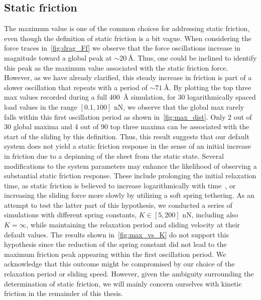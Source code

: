 \subsection{Static friction} 
The maximum value is one of the common choices for addressing static friction,
even though the definition of static friction is a bit vague. When considering
the force traces in~\cref{fig:drag_Ff} we observe that the force oscillations
increase in magnitude toward a global peak at $\sim \SI{20}{\text{Å}}$. Thus,
one could be inclined to identify this peak as the maximum value associated with
the static friction force. However, as we have already clarified, this steady
increase in friction is part of a slower oscillation that repeats with a period
of $\sim \SI{71}{\text{Å}}$. By plotting the top three max values recorded
during a full \SI{400}{Å} simulation, for 30 logarithmically spaced load values
in the range $[0.1, 100]$ nN, we observe that the global max rarely falls within
this first oscillation period as shown in~\cref{fig:max_dist}. Only 2 out of 30
global maxima and 4 out of 90 top three maxima can be associated with the start
of the sliding by this definition. Thus, this result suggests that our default
system does not yield a static friction response in the sense of an initial
increase in friction due to a depinning of the sheet from the static state.
Several modifications to the system parameters may enhance the likelihood of
observing a substantial static friction response. These include prolonging the
initial relaxation time, as static friction is believed to increase
logarithmically with time~\cite{dieterich_1972}, or increasing the sliding force
more slowly by utilizing a soft spring tethering. As an attempt to test the
latter part of this hypothesis, we conducted a series of simulations with
different spring constants, $K\in [5, 200]$ nN, including also $K = \infty$,
while maintaining the relaxation period and sliding velocity at their default
values. The results shown in~\ref{fig:max_vs_K} do not support this hypothesis
since the reduction of the spring constant did not lead to the maximum
friction peak appearing within the first oscillation period. We acknowledge that
this outcome might be compromised by our choice of the relaxation period or sliding speed. However, given the
ambiguity surrounding the determination of static friction, we will mainly
concern ourselves with kinetic friction in the remainder of this thesis.




